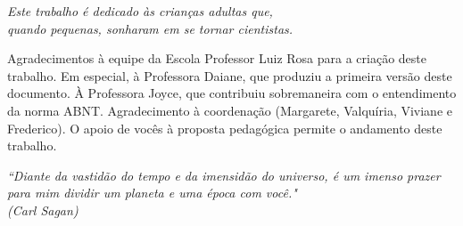 \documentclass[
	12pt,				%
	openright,			%
	oneside,			%
	a4paper,			%
	english,			%
	french,				%
	spanish,			%
	brazil				%
	]{abntex2}
\begin{document}
\frenchspacing 


\imprimircapa

\imprimirfolhaderosto*


%
% 
%

\begin{dedicatoria}
   \vspace*{\fill}
   \centering
   \noindent
   \textit{ Este trabalho é dedicado às crianças adultas que,\\
   quando pequenas, sonharam em se tornar cientistas.} \vspace*{\fill}
\end{dedicatoria}

\begin{agradecimentos}
Agradecimentos à equipe da Escola Professor Luiz Rosa para a criação deste trabalho. Em especial, à Professora Daiane, que produziu a primeira versão deste documento. À Professora Joyce, que contribuiu sobremaneira com o entendimento da norma ABNT. 
Agradecimento à coordenação (Margarete, Valquíria, Viviane e Frederico). O apoio de vocês à proposta pedagógica permite o andamento deste trabalho.

\end{agradecimentos}

\begin{epigrafe}
    \vspace*{\fill}
	\begin{flushright}
		\textit{``Diante da vastidão do tempo e da imensidão do universo, é um imenso prazer para mim dividir um planeta e uma época com você."\\
		(Carl Sagan)}
	\end{flushright}
\end{epigrafe}
\end{document}
